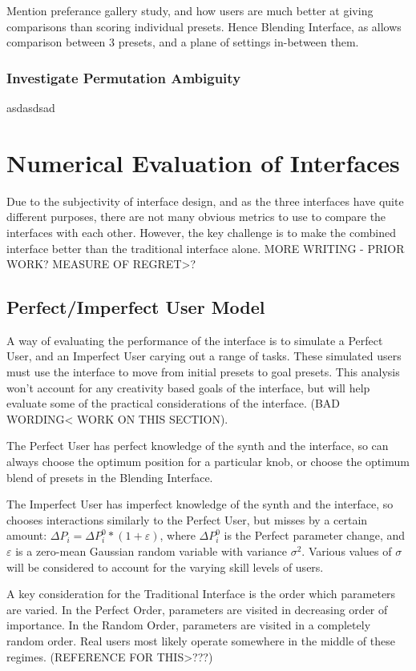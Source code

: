 \documentclass[11pt, oneside]{report}   	%
\begin{document}
Mention preferance gallery study, and how users are much better at giving comparisons than scoring individual presets. Hence Blending Interface, as allows comparison between 3 presets, and a plane of settings in-between them.


\subsection{Investigate Permutation Ambiguity}
asdasdsad

\chapter{Numerical Evaluation of Interfaces}
Due to the subjectivity of interface design, and as the three interfaces have quite different purposes, there are not many obvious metrics to use to compare the interfaces with each other. However, the key challenge is to make the combined interface better than the traditional interface alone. MORE WRITING - PRIOR WORK? MEASURE OF REGRET>?
\section{Perfect/Imperfect User Model}
A way of evaluating the performance of the interface is to simulate a Perfect User, and an Imperfect User carying out a range of tasks. These simulated users must use the interface to move from initial presets to goal presets. This analysis won't account for any creativity based goals of the interface, but will help evaluate some of the practical considerations of the interface. (BAD WORDING< WORK ON THIS SECTION).
 
The Perfect User has perfect knowledge of the synth and the interface, so can always choose the optimum position for a particular knob, or choose the optimum blend of presets in the Blending Interface.

The Imperfect User has imperfect knowledge of the synth and the interface, so chooses interactions similarly to the Perfect User, but misses by a certain amount: $\Delta P_i = \Delta P_i^0 * (1 + \varepsilon)$, where $\Delta P_i^0$ is the Perfect parameter change, and $\varepsilon$ is a zero-mean Gaussian random variable with variance $\sigma^2$. Various values of $\sigma$ will be considered to account for the varying skill levels of users.

A key consideration for the Traditional Interface is the order which parameters are varied. In the Perfect Order, parameters are visited in decreasing order of importance. In the Random Order, parameters are visited in a completely random order. Real users most likely operate somewhere in the middle of these regimes. (REFERENCE FOR THIS>???)
\end{document}
